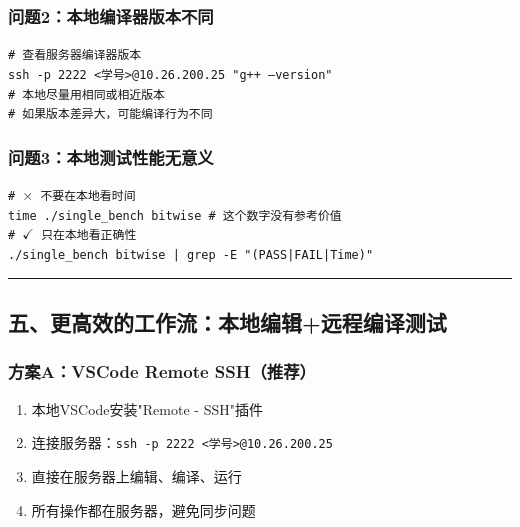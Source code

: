 \documentclass[11pt, a4paper]{article}
\begin{document}
\begin{aibox}
\subsubsection*{问题2：本地编译器版本不同}
\begin{tcolorbox}[colback=white,colframe=gray!50!white,boxrule=0.5pt,arc=2pt,left=5pt,right=5pt,top=5pt,bottom=5pt]
\texttt{\# 查看服务器编译器版本}\\
\texttt{ssh -p 2222 \textless 学号\textgreater @10.26.200.25 "g++ --version"}\\[0.5em]
\texttt{\# 本地尽量用相同或相近版本}\\
\texttt{\# 如果版本差异大，可能编译行为不同}
\end{tcolorbox}

\subsubsection*{问题3：本地测试性能无意义}
\begin{tcolorbox}[colback=white,colframe=gray!50!white,boxrule=0.5pt,arc=2pt,left=5pt,right=5pt,top=5pt,bottom=5pt]
\texttt{\# $\times$ 不要在本地看时间}\\
\texttt{time ./single\_bench bitwise  \# 这个数字没有参考价值}\\[0.5em]
\texttt{\# $\checkmark$ 只在本地看正确性}\\
\texttt{./single\_bench bitwise | grep -E "(PASS|FAIL|Time)"}
\end{tcolorbox}

\begin{center}\rule{\textwidth}{0.4pt}\end{center}

\subsection*{五、更高效的工作流：本地编辑+远程编译测试}

\subsubsection*{方案A：VSCode Remote SSH（推荐）}
\begin{enumerate}
    \item 本地VSCode安装"Remote - SSH"插件
    \item 连接服务器：\texttt{ssh -p 2222 \textless 学号\textgreater @10.26.200.25}
    \item 直接在服务器上编辑、编译、运行
    \item 所有操作都在服务器，避免同步问题
\end{enumerate}


\end{aibox}
\end{document}
